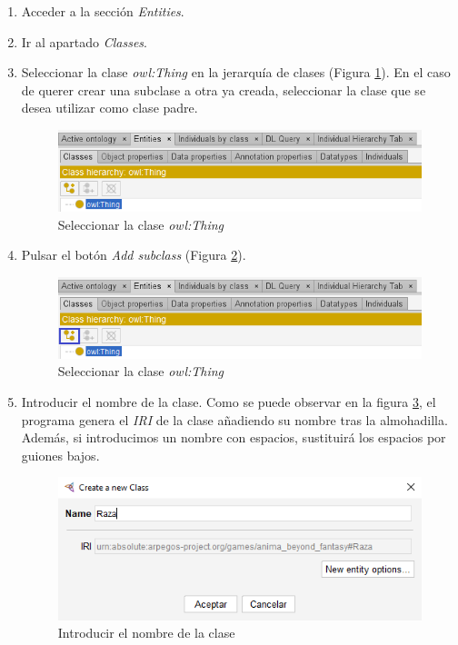 \begin{enumerate}
    \item Acceder a la sección \textit{Entities}.
    \item Ir al apartado \textit{Classes}.
    \item Seleccionar la clase \textit{owl:Thing} en la jerarquía de clases (Figura \ref*{CreateClass_1}). En el caso de 
    querer crear una subclase a otra ya creada, seleccionar la clase que se desea utilizar como clase padre.
    \begin{figure}[H]
        \centering
        \includegraphics[scale=0.6]{Figures/Protege/CreateClass_1.png}
        \caption{Seleccionar la clase \textit{owl:Thing}}
        \label{CreateClass_1}
    \end{figure}
    
    \item Pulsar el botón \textit{Add subclass} (Figura \ref*{CreateClass_2}).
    
    \begin{figure}[ht]
        \centering
        \includegraphics[scale=0.6]{Figures/Protege/CreateClass_2.png}
        \caption{Seleccionar la clase \textit{owl:Thing}}
        \label{CreateClass_2}
    \end{figure}

    \item Introducir el nombre de la clase. Como se puede observar en la figura \ref*{CreateClass_3}, el programa genera 
    el \textit{IRI} de la clase añadiendo su nombre tras la almohadilla. Además, si introducimos un nombre con espacios, 
    \protege sustituirá los espacios por guiones bajos.

    \begin{figure}[H]
        \centering
        \includegraphics[scale=0.6]{Figures/Protege/CreateClass_3.png}
        \caption{Introducir el nombre de la clase}
        \label{CreateClass_3}
    \end{figure}


\end{enumerate}
